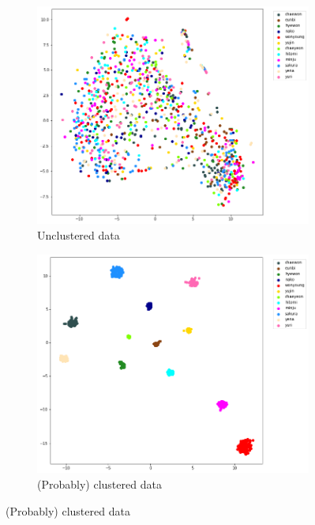\begin{enumerate}
    \begin{figure}[htbp]
        \begin{subfigure}[]{0.49\textwidth}
            \includegraphics[trim=0 0 100 0, clip, width=\textwidth]{images/faceReco/tsne-example-unclustered.png}
            \caption{Unclustered data}
            \label{Figure:Face-Recognition:method:tsne-example:unclustered}
        \end{subfigure}
        \hfill
        \begin{subfigure}[]{0.49\textwidth}
            \includegraphics[trim=0 0 100 0, clip, width=\textwidth]{images/faceReco/tsne-example-clustered.png}
            \caption{(Probably) clustered data}
            \label{Figure:Face-Recognition:method:tsne-example:clustered}
        \end{subfigure}
        \hfill


\end{figure}
\end{enumerate}
